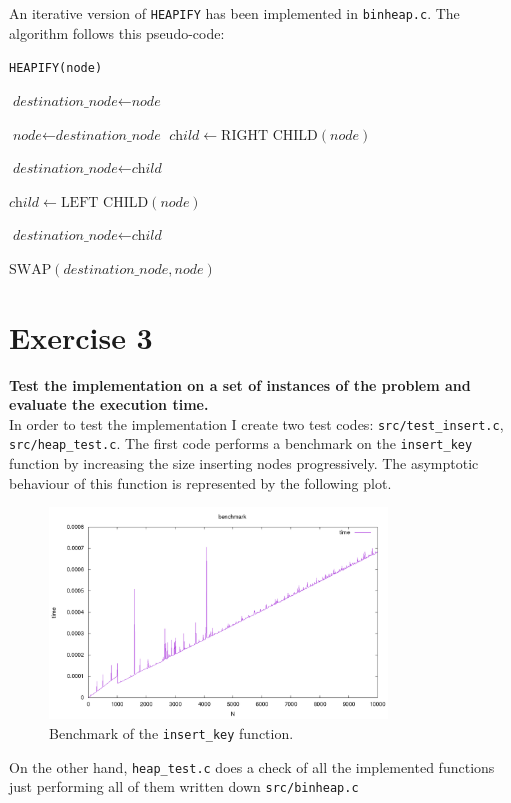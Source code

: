 \documentclass{article}
\begin{document}
	\noindent An iterative version of \texttt{HEAPIFY} has been implemented in \texttt{binheap.c}. The algorithm follows this pseudo-code:
	\newpage
	\begin{algorithm}
		\caption{\texttt{HEAPIFY(node)}}\label{euclid}
	\begin{algorithmic}
		\State $\textit{destination\_node} \gets \textit{node}$
		\Do
		
		\State $\textit{node} \gets \textit{destination\_node}$
		\State $\textit{child} \gets \text{RIGHT CHILD}(\textit{node})$
		
		\State $\textit{destination\_node} \gets \textit{child}$
		\EndIf
		
		\State $\textit{child} \gets \text{LEFT CHILD}(\textit{node})$
		
		\State $\textit{destination\_node} \gets \textit{child}$
		\EndIf
		
		\State $\text{SWAP}(\textit{destination\_node}, \textit{node})$
		\EndIf
		
	\end{algorithmic}
	\end{algorithm}
	
	\section*{Exercise 3}
	\textbf{Test the implementation on a set of instances of the problem and evaluate the execution time.} \\
	
	\noindent In order to test the implementation I create two test codes: \texttt{src/test\_insert.c}, \texttt{src/heap\_test.c}. The first code performs a benchmark on the \texttt{insert\_key} function by increasing the size inserting nodes progressively. The asymptotic behaviour of this function is represented by the following plot.
	\begin{figure}[h]
		\centering
		\includegraphics[width=0.8\textwidth]{../plot/plot_benchmark.png}  
		\caption{Benchmark of the \texttt{insert\_key} function.}
		\label{plot}
	\end{figure}
	\newpage
	\noindent On the other hand, \texttt{heap\_test.c} does a check of all the implemented functions just performing all of them written down \texttt{src/binheap.c}
	
\end{document}

